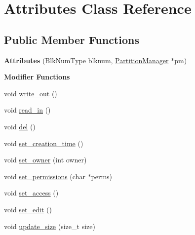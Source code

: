 \hypertarget{classAttributes}{}\section{Attributes Class Reference}
\label{classAttributes}
\subsection*{Public Member Functions}
\begin{DoxyCompactItemize}
\item 
\mbox{\label{classAttributes_a0d6b154029e34f811f0930806768f022}} 
{\bfseries Attributes} (Blk\+Num\+Type blknum, \mbox{\hyperlink{classPartitionManager}{Partition\+Manager}} $\ast$pm)
\end{DoxyCompactItemize}
\begin{Indent}\textbf{ Modifier Functions}\par
\begin{DoxyCompactItemize}
\item 
void \mbox{\hyperlink{classAttributes_a7066f30d97317f75a02a137d09a2065e}{write\+\_\+out}} ()
\item 
void \mbox{\hyperlink{classAttributes_ac33fbd6871ef707878690be92b9fc7ec}{read\+\_\+in}} ()
\item 
void \mbox{\hyperlink{classAttributes_acf28e724c914f066ecdae788d95b3212}{del}} ()
\item 
void \mbox{\hyperlink{classAttributes_a4c518dae976d9186337f655f7b09cecc}{set\+\_\+creation\+\_\+time}} ()
\item 
void \mbox{\hyperlink{classAttributes_affdf3abb52a45ac3c9051bafd0da9e7e}{set\+\_\+owner}} (int owner)
\item 
void \mbox{\hyperlink{classAttributes_aac8ca00f98b22280df69f62e42b72b8b}{set\+\_\+permissions}} (char $\ast$perms)
\item 
void \mbox{\hyperlink{classAttributes_af2ce6f6dce652a7adfeba3f28b4ee0bc}{set\+\_\+access}} ()
\item 
void \mbox{\hyperlink{classAttributes_a88674bf65fba99d32870c7fa48edf135}{set\+\_\+edit}} ()
\item 
void \mbox{\hyperlink{classAttributes_a3983ec45af66e9b19367222092b7df6c}{update\+\_\+size}} (size\+\_\+t size)
\end{DoxyCompactItemize}
\end{Indent}
